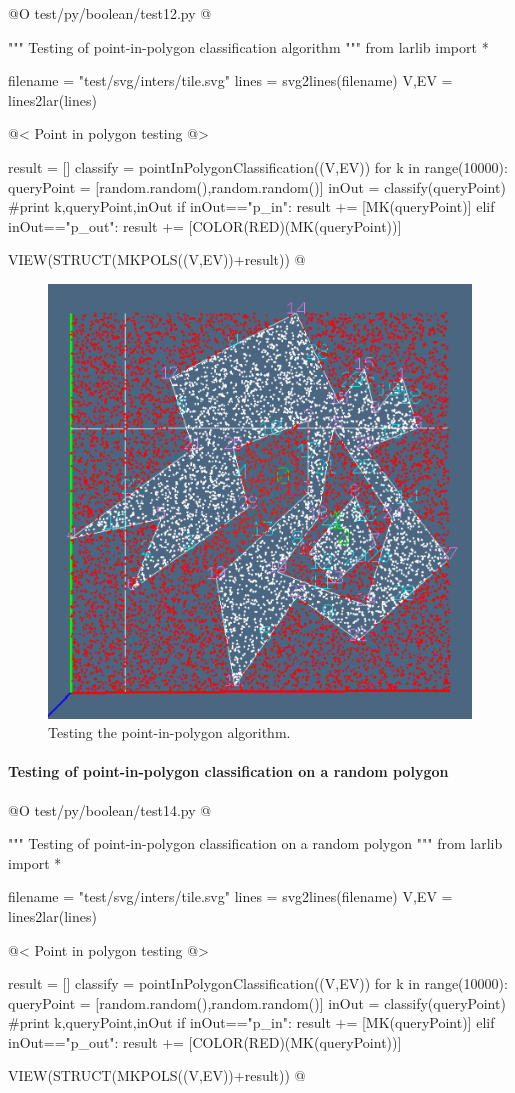 \documentclass[11pt,oneside]{article}    %
\begin{document}
@O test/py/boolean/test12.py @{
""" Testing of point-in-polygon classification algorithm """
from larlib import *

filename = "test/svg/inters/tile.svg"
lines = svg2lines(filename)
V,EV = lines2lar(lines)

@< Point in polygon testing @>

result = []
classify = pointInPolygonClassification((V,EV))
for k in range(10000):
    queryPoint = [random.random(),random.random()]
    inOut = classify(queryPoint)
    #print k,queryPoint,inOut
    if inOut=="p_in": result += [MK(queryPoint)]
    elif inOut=="p_out": result += [COLOR(RED)(MK(queryPoint))]

VIEW(STRUCT(MKPOLS((V,EV))+result))
@}

\begin{figure}[htbp] %
   \centering
   \includegraphics[width=0.5\linewidth]{images/pointInPolygon} 
   \caption{Testing the point-in-polygon algorithm.}
   \label{fig:pointInPolygon}
\end{figure}


\paragraph{Testing of point-in-polygon classification on a random polygon}

@O test/py/boolean/test14.py @{
""" Testing of point-in-polygon classification  on a random polygon """
from larlib import *

filename = "test/svg/inters/tile.svg"
lines = svg2lines(filename)
V,EV = lines2lar(lines)

@< Point in polygon testing @>

result = []
classify = pointInPolygonClassification((V,EV))
for k in range(10000):
    queryPoint = [random.random(),random.random()]
    inOut = classify(queryPoint)
    #print k,queryPoint,inOut
    if inOut=="p_in": result += [MK(queryPoint)]
    elif inOut=="p_out": result += [COLOR(RED)(MK(queryPoint))]

VIEW(STRUCT(MKPOLS((V,EV))+result))
@}
\end{document}
